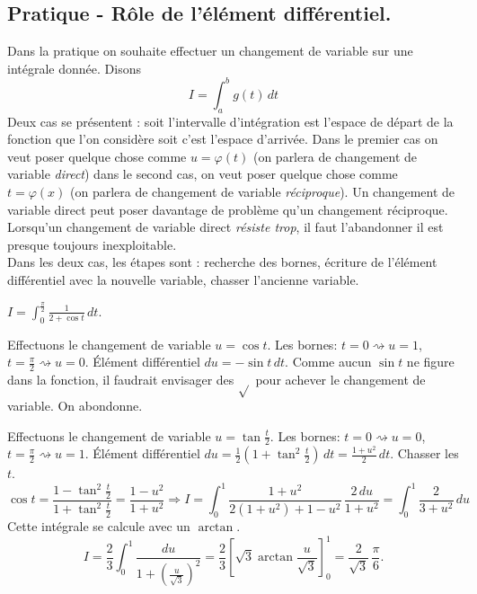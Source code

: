 \subsection{Pratique - Rôle de l'élément différentiel.}
Dans la pratique on souhaite effectuer un changement de variable sur une intégrale donnée. Disons
\begin{displaymath}
 I = \int_{a}^{b}g(t)\,dt
\end{displaymath}
Deux cas se présentent : soit l'intervalle d'intégration est l'espace de départ de la fonction que l'on considère soit c'est l'espace d'arrivée. Dans le premier cas on veut poser quelque chose comme $u=\varphi(t)$ (on parlera de changement de variable \emph{direct}) dans le second cas, on veut poser quelque chose comme $t=\varphi(x)$ (on parlera de changement de variable \emph{réciproque}). Un changement de variable direct peut poser davantage de problème qu'un changement réciproque. Lorsqu'un changement de variable direct \og\emph{résiste trop}\fg, il faut l'abandonner il est presque toujours inexploitable.\\
Dans les deux cas, les étapes sont  : recherche des bornes, écriture de l'élément différentiel avec la nouvelle variable, chasser l'ancienne variable.

\begin{exple}
 $I=\int_0^{\frac{\pi}{2}}\frac{1}{2+\cos t}\,dt$.
 
Effectuons le changement de variable  $u=\cos t$.\newline
Les bornes: $t = 0 \rightsquigarrow u = 1$, $t = \frac{\pi}{2} \rightsquigarrow u = 0$.\newline
\'Elément différentiel $du = - \sin t\, dt$. Comme aucun $\sin t$ ne figure dans la fonction, il faudrait envisager des $\sqrt{} $ pour achever le changement de variable. On abondonne.

Effectuons le changement de variable $u=\tan \frac{t}{2}$.\newline
Les bornes: $t = 0 \rightsquigarrow u = 0$, $t = \frac{\pi}{2} \rightsquigarrow u = 1$.\newline
\'Elément différentiel $du = \frac{1}{2}\left( 1+\tan^2\frac{t}{2}\right) \, dt = \frac{1+u^2}{2}\, dt$.\newline
Chasser les $t$.
\[
 \cos t = \frac{1-\tan^2\frac{t}{2}}{1+\tan^2\frac{t}{2}} = \frac{1-u^2}{1+u^2}
 \Rightarrow I = \int_{0}^{1}\frac{1+u^2}{2(1+u^2)+1-u^2}\,\frac{2\,du}{1+u^2}
 = \int_{0}^{1}\frac{2}{3+u^2}\, du
\]
Cette intégrale se calcule avec un $\arctan$.
\[
 I = \frac{2}{3}\int_{0}^{1} \frac{du}{1+(\frac{u}{\sqrt{3}})^2}
 = \frac{2}{3}\left[ \sqrt{3} \arctan\frac{u}{\sqrt{3}} \right]_{0}^{1} 
 = \frac{2}{\sqrt{3}}\,\frac{\pi}{6}.
\]

\end{exple}

